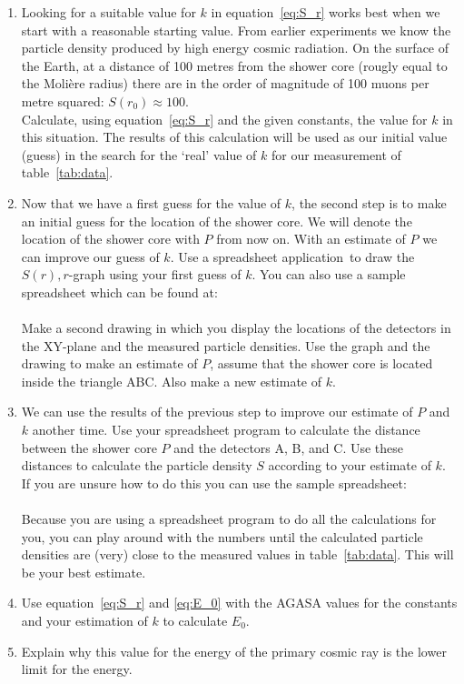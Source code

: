 \documentclass[12pt,a4paper]{article}
\numberwithin{equation}{section}
\numberwithin{figure}{section}
\numberwithin{table}{section}
\begin{document}
\begin{shaded}
\begin{enumerate}[-]
\item Looking for a suitable value for $k$ in equation~\ref{eq:S_r} works best when we start with a reasonable starting value. From earlier experiments we know the particle density produced by high energy cosmic radiation. On the surface of the Earth, at a distance of 100 metres from the shower core (rougly equal to the Moli\`ere radius) there are in the order of magnitude of 100 muons per metre squared: $S(r_0)\approx 100$. \\ Calculate, using equation~\ref{eq:S_r} and the given constants, the value for $k$ in this situation. The results of this calculation will be used as our initial value (guess) in the search for the `real' value of $k$ for our measurement of table~\ref{tab:data}.
\item Now that we have a first guess for the value of $k$, the second step is to make an initial guess for the location of the shower core. We will denote the location of the shower core with $P$ from now on. With an estimate of $P$ we can improve our guess of $k$. Use a spreadsheet application\footnotemark ~to draw the $S(r),r$-graph using your first guess of $k$. You can also use a sample spreadsheet which can be found at:\\
 \\
Make a second drawing in which you display the locations of the detectors in the XY-plane and the measured particle densities. Use the graph and the drawing to make an estimate of $P$, assume that the shower core is located inside the triangle ABC. Also make a new estimate of $k$.
\item We can use the results of the previous step to improve our estimate of $P$ and $k$ another time. Use your spreadsheet program to calculate the distance between the shower core $P$ and the detectors A, B, and C. Use these distances to calculate the particle density $S$ according to your estimate of $k$. If you are unsure how to do this you can use the sample spreadsheet:\\
\\
Because you are using a spreadsheet program to do all the calculations for you, you can play around with the numbers until the calculated particle densities are (very) close to the measured values in table~\ref{tab:data}. This will be your best estimate.
\item Use equation~\ref{eq:S_r} and \ref{eq:E_0} with the AGASA values for the constants and your estimation of $k$ to calculate $ E_0$.
\item Explain why this value for the energy of the primary cosmic ray is the lower limit for the energy.
\end{enumerate}\end{shaded}
\end{document}
